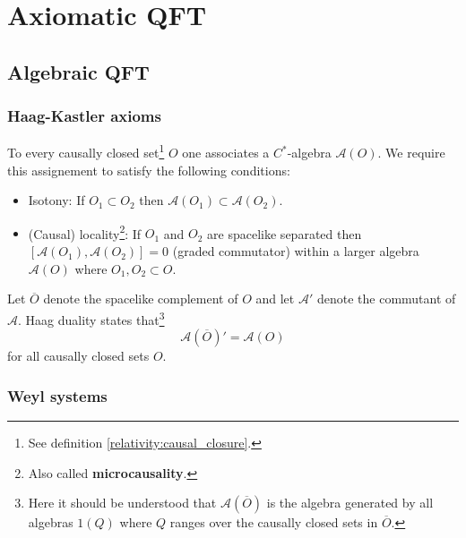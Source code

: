 \chapter{Axiomatic QFT}

\section{Algebraic QFT}
\subsection{Haag-Kastler axioms}

	\begin{axiom}\label{qft:microcausality}
		To every causally closed set\footnote{See definition \ref{relativity:causal_closure}.} $O$ one associates a $C^*$-algebra $\mathcal{A}(O)$. We require this assignement to satisfy the following conditions:
		\begin{itemize}
			\item Isotony: If $O_1\subset O_2$ then $\mathcal{A}(O_1)\subset\mathcal{A}(O_2)$.
			\item (Causal) locality\footnote{Also called \textbf{microcausality}.}: If $O_1$ and $O_2$ are spacelike separated then $[\mathcal{A}(O_1), \mathcal{A}(O_2)] = 0$ (graded commutator) within a larger algebra $\mathcal{A}(O)$ where $O_1, O_2\subset O$.
		\end{itemize}
	\end{axiom}
	
	\begin{axiom}
		Let $\overline{O}$ denote the spacelike complement of $O$ and let $\mathcal{A}'$ denote the commutant of $\mathcal{A}$. Haag duality states that\footnote{Here it should be understood that $\mathcal{A}\left(\overline{O}\right)$ is the algebra generated by all algebras $\mathcal{1}(Q)$ where $Q$ ranges over the causally closed sets in $\overline{O}$.}
		\begin{equation}
			\mathcal{A}\left(\overline{O}\right)' = \mathcal{A}(O)
		\end{equation}
		for all causally closed sets $O$.
	\end{axiom}
	
\subsection{Weyl systems}

